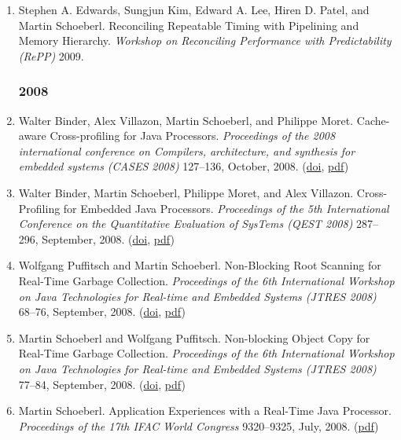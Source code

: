 \begin{enumerate}
\item Stephen A. Edwards, Sungjun Kim, Edward A. Lee, Hiren D. Patel, and Martin Schoeberl.
 Reconciling Repeatable Timing with Pipelining and Memory Hierarchy.
 \emph{Workshop on Reconciling Performance with Predictability (RePP)} 2009.



\subsubsection*{2008}

\item Walter Binder, Alex Villazon, Martin Schoeberl, and Philippe Moret.
 Cache-aware Cross-profiling for Java Processors.
 \emph{Proceedings of the 2008 international conference on Compilers, architecture, and synthesis for embedded systems (CASES 2008)} 127--136, October, 2008.
(\href{http://dx.doi.org/10.1145/1450095.1450116}{doi}, \href{http://www.jopdesign.com/doc/crossprofiling_cases2008.pdf}{pdf})

\item Walter Binder, Martin Schoeberl, Philippe Moret, and Alex Villazon.
 Cross-Profiling for Embedded Java Processors.
 \emph{Proceedings of the 5th International Conference on the Quantitative Evaluation of SysTems (QEST 2008)} 287--296, September, 2008.
(\href{http://dx.doi.org/10.1109/QEST.2008.39}{doi}, \href{http://www.jopdesign.com/doc/crossprofiling_qest2008.pdf}{pdf})

\item Wolfgang Puffitsch and Martin Schoeberl.
 Non-Blocking Root Scanning for Real-Time Garbage Collection.
 \emph{Proceedings of the 6th International Workshop on Java Technologies for Real-time and Embedded Systems (JTRES 2008)} 68--76, September, 2008.
(\href{http://dx.doi.org/10.1145/1434790.1434801}{doi}, \href{http://www.jopdesign.com/doc/nbrs.pdf}{pdf})

\item Martin Schoeberl and Wolfgang Puffitsch.
 Non-blocking Object Copy for Real-Time Garbage Collection.
 \emph{Proceedings of the 6th International Workshop on Java Technologies for Real-time and Embedded Systems (JTRES 2008)} 77--84, September, 2008.
(\href{http://dx.doi.org/10.1145/1434790.1434802}{doi}, \href{http://www.jopdesign.com/doc/gchwcp.pdf}{pdf})

\item Martin Schoeberl.
 Application Experiences with a Real-Time Java Processor.
 \emph{Proceedings of the 17th IFAC World Congress} 9320--9325, July, 2008.
(\href{http://www.jopdesign.com/doc/jop_app.pdf}{pdf})


\end{enumerate}
